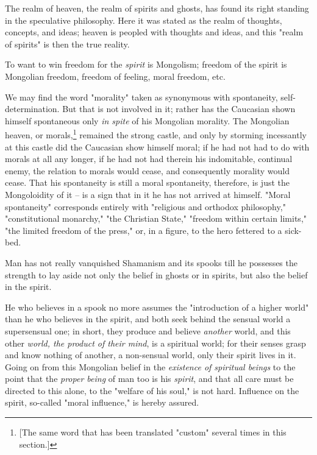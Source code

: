 The realm of heaven, the realm of spirits and ghosts, has found its right 
standing in the speculative philosophy. Here it was stated as the realm of 
thoughts, concepts, and ideas; heaven is peopled with thoughts and ideas, and 
this "{}realm of spirits"{} is then the true reality.

To want to win freedom for the \textit{spirit} is Mongolism; freedom of the 
spirit is Mongolian freedom, freedom of feeling, moral freedom, etc.

We may find the word "{}morality"{} taken as synonymous with spontaneity, 
self-determination. But that is not involved in it; rather has the Caucasian 
shown himself spontaneous only \textit{in spite} of his Mongolian morality. 
The Mongolian heaven, or morals,\footnote{[The same word that has been 
translated "{}custom"{} several times in this section.]} remained the strong 
castle, and only by storming incessantly at this castle did the Caucasian show 
himself moral; if he had not had to do with morals at all any longer, if he 
had not had therein his indomitable, continual enemy, the relation to morals 
would cease, and consequently morality would cease. That his spontaneity is 
still a moral spontaneity, therefore, is just the Mongoloidity of it -- is a 
sign that in it he has not arrived at himself. "{}Moral spontaneity"{} 
corresponds entirely with "{}religious and orthodox philosophy,"{} 
"{}constitutional monarchy,"{} "{}the Christian State,"{} "{}freedom within 
certain limits,"{} "{}the limited freedom of the press,"{} or, in a figure, to 
the hero fettered to a sick-bed.

Man has not really vanquished Shamanism and its spooks till he possesses the 
strength to lay aside not only the belief in ghosts or in spirits, but also 
the belief in the spirit.

He who believes in a spook no more assumes the "{}introduction of a higher 
world"{} than he who believes in the spirit, and both seek behind the sensual 
world a supersensual one; in short, they produce and believe \textit{another} 
world, and this other \textit{world, the product of their mind}, is a 
spiritual world; for their senses grasp and know nothing of another, a 
non-sensual world, only their spirit lives in it. Going on from this Mongolian 
belief in the \textit{existence of spiritual beings} to the point that the 
\textit{proper being} of man too is his \textit{spirit}, and that all care 
must be directed to this alone, to the "{}welfare of his soul,"{} is not hard. 
Influence on the spirit, so-called "{}moral influence,"{} is hereby assured.


